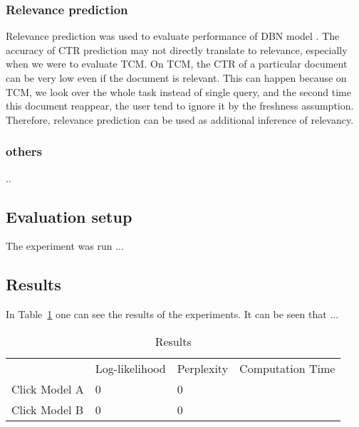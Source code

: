\subsubsection{Relevance prediction}
Relevance prediction was used to evaluate performance of DBN model \cite[p. 6]{Chapelle2009}.
The accuracy of CTR prediction may not directly translate to relevance, especially when we were to evaluate TCM.
On TCM, the CTR of a particular document can be very low even if the document is relevant.
This can happen because on TCM, we look over the whole task instead of single query, and the second time this document reappear, the user tend to ignore it by the freshness assumption.
Therefore, relevance prediction can be used as additional inference of relevancy.


\subsubsection{others}
..

\subsection{Evaluation setup}
The experiment was run ...

\subsection{Results}
In Table~\ref{table:results} one can see the results of the experiments.
It can be seen that ...

\begin{table}[h]
\centering
\begin{tabular}{l|lll|}
\cline{2-4}
                                          & Log-likelihood  & Perplexity        & Computation Time \\
\cline{1-4}
\multicolumn{1}{|l|}{Click Model A}       & 0               & 0                 &   \\
\multicolumn{1}{|l|}{Click Model B}       & 0               & 0                 &   \\
\cline{1-4}
\end{tabular}
\caption{Results}
\label{table:results}
\end{table}
